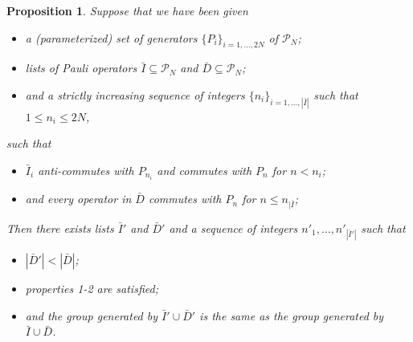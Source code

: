 \documentclass[twocolumn,showpacs,preprintnumbers,amsmath,amssymb,nofootinbib,pra,floatfix]{revtex4}
\newtheorem{proposition}{Proposition}
\begin{document}
\begin{proposition}
\label{make-independent-using-elimination}
Suppose that we have been given
\begin{itemize}
\item a (parameterized) set of generators $\{P_i\}_{i=1,\dots,2N}$ of $\mathscr{P}_N$;
\item lists of Pauli operators $\bar I\subseteq \mathscr{P}_N$ and  $\bar D\subseteq \mathscr{P}_N$;
\item and a strictly increasing sequence of integers $\{n_i\}_{i=1,\dots,|\bar I|}$ such that $1\le n_i \le 2N$,
\end{itemize}
such that
\begin{itemize}
\item \label{independent-of-below} $\bar I_i$ anti-commutes with $P_{n_i}$ and commutes with $P_n$ for $n<n_i$;
\item \label{empty-of-paulis-before-index} and every operator in $\bar D$ commutes with $P_n$ for $n\le n_{|\bar I}$;
\end{itemize}
Then there exists lists $\bar I'$ and $\bar D'$ and a sequence of integers $n'_1,\dots,n'_{|\bar I'|}$ such that
\begin{itemize}
\item $|\bar D'|<|\bar D|$;
\item properties 1-2 are satisfied;
\item and the group generated by $\bar I'\cup \bar D'$ is the same as the group generated by $\bar I \cup \bar D$.
\end{itemize}
\end{proposition}
\end{document}
